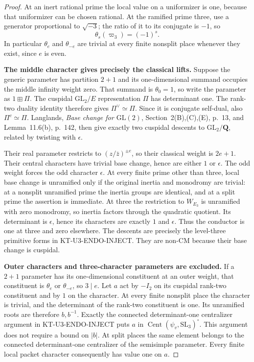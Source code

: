 \documentclass[11pt,a4paper]{article}
\theoremstyle{definition}
\renewcommand{\paragraph}[1]{\par\smallskip\noindent\textbf{#1}\quad\ignorespaces}
\begin{document}
\begin{proof}
At an inert rational prime the local value on a uniformizer is one,
because that uniformizer can be chosen rational. At the ramified
prime three, use a generator proportional to $\sqrt{-3}$; the ratio
of it to its conjugate is $-1$, so
\[
                  \theta_s(\varpi_3)=(-1)^s.
\]
In particular $\theta_e$ and $\theta_{-e}$ are trivial at every
finite nonsplit place whenever they exist, since $e$ is even.

\paragraph{The middle character gives precisely the classical lifts.}
Suppose the generic parameter has partition $2+1$ and its
one-dimensional summand occupies the middle infinity weight zero.
That summand is $\theta_0=1$, so write the parameter as $1\boxplus\Pi$.
The cuspidal $\mathrm{GL}_2/E$ representation $\Pi$ has determinant
one. The rank-two duality identity therefore gives
$\Pi^\vee\simeq\Pi$. Since it is conjugate self-dual, also
$\Pi^c\simeq\Pi$. Langlands, \emph{Base change for $\mathrm{GL}(2)$},
Section~2(B),(C),(E), p.~13, and Lemma~11.6(b), p.~142,
then give exactly two cuspidal descents to $\mathrm{GL}_2/\mathbf Q$,
related by twisting with $\epsilon$.

Their real parameter restricts to $(z/\bar z)^{\pm e}$, so their
classical weight is $2e+1$. Their central characters have trivial
base change, hence are either $1$ or $\epsilon$. The odd weight
forces the odd character $\epsilon$.
At every finite prime other than three, local base change is
unramified only if the original inertia and monodromy are trivial:
at a nonsplit unramified prime the inertia groups are identical,
and at a split prime the assertion is immediate.
At three the restriction to $W_{E_3}$ is unramified with zero
monodromy, so inertia factors through the quadratic quotient.
Its determinant is $\epsilon$, hence its characters are exactly
$1$ and $\epsilon$. Thus the conductor is one at three and zero
elsewhere. The descents are precisely the level-three primitive
forms in KT-U3-ENDO-INJECT. They are non-CM because their base
change is cuspidal.

\paragraph{Outer characters and three-character parameters are excluded.}
If a $2+1$ parameter has its one-dimensional constituent at an
outer weight, that constituent is $\theta_e$ or $\theta_{-e}$,
so $3\mid e$. Let $a$ act by $-I_2$ on its cuspidal rank-two
constituent and by $1$ on the character. At every finite nonsplit
place the character is trivial, and the determinant of the
rank-two constituent is one. Its unramified roots are therefore
$b,b^{-1}$. Exactly the connected determinant-one centralizer
argument in KT-U3-ENDO-INJECT puts $a$ in
$\operatorname{Cent}(\psi_v,\mathrm{SL}_3)^\circ$.
This argument does not require a bound on $|b|$.
At split places the same element belongs to the connected
determinant-one centralizer of the semisimple parameter.
Every finite local packet character consequently has value one
on $a$.


\end{proof}
\end{document}
